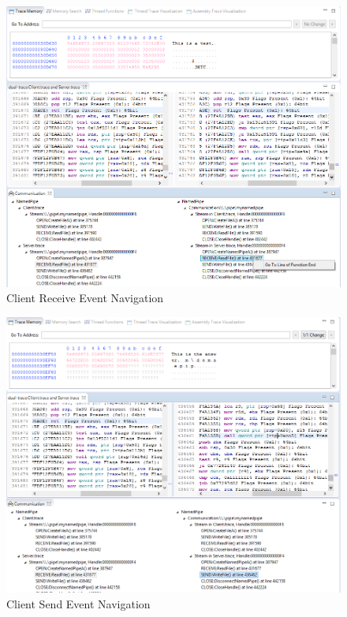\begin{figure}[H]
\centerline{\includegraphics[scale=0.4]{Figures/result1_server_read}}
 \caption{Client Receive Event Navigation}
\label{result1_server_read}
\end{figure}

\begin{figure}[H]
\centerline{\includegraphics[scale=0.4]{Figures/result1_server_send}}
 \caption{Client Send Event Navigation}
\label{result1_server_send}
\end{figure}

